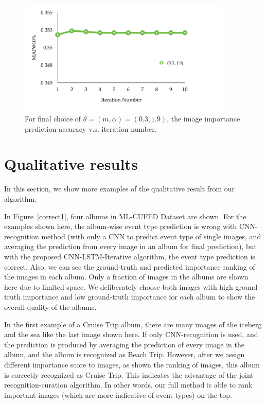 \documentclass[runningheads]{llncs}
\begin{document}
\begin{figure}
\vspace{-0.1in}
\centering
\includegraphics[width=4in]{importance_iter}
\caption{For final choice of $\theta=(m, \alpha) = (0.3, 1.9)$, the image importance prediction accuracy v.s. iteration number.}
\label{importance_iter}
\vspace{-0.2in}
\end{figure}

\section{Qualitative results}
In this section, we show more examples of the qualitative result from our algorithm.

In Figure~\ref{correct1}, four albums in ML-CUFED Dataset are shown. For the examples shown here, the album-wise event type prediction is wrong with CNN-recognition method (with only a CNN to predict event type of single images, and averaging the prediction from every image in an album for final prediction), but with the proposed CNN-LSTM-Iterative algorithm, the event type prediction is correct. Also, we can see the ground-truth and predicted importance ranking of the images in each album. Only a fraction of images in the albums are shown here due to limited space. We deliberately choose both images with high ground-truth importance and low ground-truth importance for each album to show the overall quality of the albums.

In the first example of a Cruise Trip album, there are many images of the iceberg and the sea like the last image shown here. If only CNN-recognition is used, and the prediction is produced by averaging the prediction of every image in the album, and the album is recognized as Beach Trip. However, after we assign different importance score to images, as shown the ranking of images, this album is correctly recognized as Cruise Trip. This indicates the advantage of the joint recognition-curation algorithm. In other words, our full method is able to rank important images (which are more indicative of event types) on the top. 
 
\end{document}
